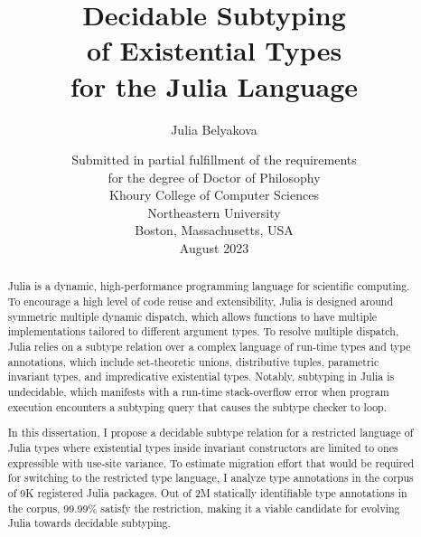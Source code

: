 \title{Decidable Subtyping\\ of Existential Types\\for the Julia Language}

\author{Julia Belyakova}

\date{\normalsize%
\vfill
\vspace{6cm}
Submitted in partial fulfillment of the requirements\\
for the degree of Doctor of Philosophy\\
\vspace{1em}
Khoury College of Computer Sciences\\
Northeastern University\\
Boston, Massachusetts, USA\\
\vspace{1em}
August 2023
}

\maketitle



\begin{abstract}

Julia is a dynamic, high-performance programming language
for scientific computing.
To encourage a high level of code reuse and extensibility, Julia is
designed around symmetric multiple dynamic dispatch, which allows functions
to have multiple implementations tailored to different argument types.
To resolve multiple dispatch, Julia relies on a subtype relation over a complex
language of run-time types and type annotations, 
which include set-theoretic unions, distributive tuples, parametric invariant 
types, and impredicative existential types.
Notably, subtyping in Julia is undecidable, which
manifests with a run-time stack-overflow error when program execution encounters
a subtyping query that causes the subtype checker to loop.

In this dissertation, I propose a decidable subtype relation for a restricted
language of Julia types where existential types inside invariant constructors
are limited to ones expressible with use-site variance.
To estimate migration effort that would be required for switching to the 
restricted type language, I analyze type annotations in the corpus of 9K
registered Julia packages.
Out of 2M statically identifiable type annotations in the corpus,
99.99\% satisfy the restriction, making it a viable candidate for
evolving Julia towards decidable subtyping.

\end{abstract}
